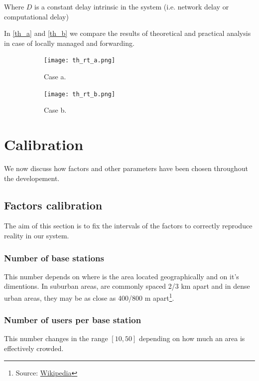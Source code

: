 \documentclass{report}
\begin{document}
Where $D$ is a constant delay intrinsic in the system (i.e. network delay or computational delay)

In \autoref{th_a} and \autoref{th_b} we compare the results of theoretical and practical analysis in case of locally managed and forwarding.

\begin{figure}[H]
    \begin{subfigure}{0.55\textwidth}
        \centering
        \texttt{[image: th\_rt\_a.png]}
        \caption{Case a.}
        \label{th_a}
    \end{subfigure}
    \begin{subfigure}{0.55\textwidth}
        \centering
        \texttt{[image: th\_rt\_b.png]}
        \caption{Case b.}
        \label{th_b}
    \end{subfigure}
    \caption{}
\end{figure}

\chapter{Calibration}
We now discuss how factors and other parameters have been chosen throughout the developement.

\section{Factors calibration}
The aim of this section is to fix the intervals of the factors to correctly reproduce reality in our system.

\subsection{Number of base stations}
This number depends on where is the area located geographically and on it's dimentions.
In suburban areas, are commonly spaced 2/3 km apart and in dense urban areas, they may be as close as 400/800 m apart\footnote{Source: \href{https://en.wikipedia.org/wiki/Cell_site}{Wikipedia}}.

\subsection{Number of users per base station}
This number changes in the range $[10, 50]$ depending on how much an area is effectively crowded.%

\appendix



\end{document}
